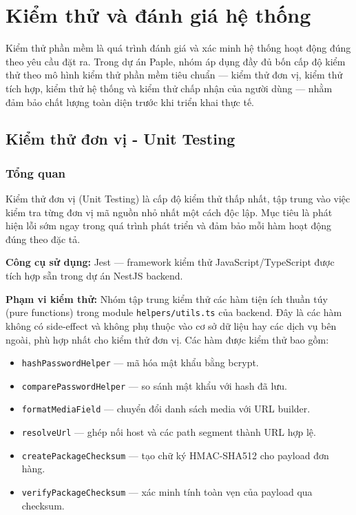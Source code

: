 ﻿\section{Kiểm thử và đánh giá hệ thống}

Kiểm thử phần mềm là quá trình đánh giá và xác minh hệ thống hoạt động đúng theo yêu cầu đặt ra. Trong dự án Paple, nhóm áp dụng đầy đủ bốn cấp độ kiểm thử theo mô hình kiểm thử phần mềm tiêu chuẩn — kiểm thử đơn vị, kiểm thử tích hợp, kiểm thử hệ thống và kiểm thử chấp nhận của người dùng — nhằm đảm bảo chất lượng toàn diện trước khi triển khai thực tế.

\subsection{Kiểm thử đơn vị - Unit Testing}

\subsubsection{Tổng quan}

Kiểm thử đơn vị (Unit Testing) là cấp độ kiểm thử thấp nhất, tập trung vào việc kiểm tra từng đơn vị mã nguồn nhỏ nhất một cách độc lập. Mục tiêu là phát hiện lỗi sớm ngay trong quá trình phát triển và đảm bảo mỗi hàm hoạt động đúng theo đặc tả.

\textbf{Công cụ sử dụng:} Jest — framework kiểm thử JavaScript/TypeScript được tích hợp sẵn trong dự án NestJS backend.

\textbf{Phạm vi kiểm thử:} Nhóm tập trung kiểm thử các hàm tiện ích thuần túy (pure functions) trong module \texttt{helpers/utils.ts} của backend. Đây là các hàm không có side-effect và không phụ thuộc vào cơ sở dữ liệu hay các dịch vụ bên ngoài, phù hợp nhất cho kiểm thử đơn vị. Các hàm được kiểm thử bao gồm:

\begin{itemize}
  \item \texttt{hashPasswordHelper} — mã hóa mật khẩu bằng bcrypt.
  \item \texttt{comparePasswordHelper} — so sánh mật khẩu với hash đã lưu.
  \item \texttt{formatMediaField} — chuyển đổi danh sách media với URL builder.
  \item \texttt{resolveUrl} — ghép nối host và các path segment thành URL hợp lệ.
  \item \texttt{createPackageChecksum} — tạo chữ ký HMAC-SHA512 cho payload đơn hàng.
  \item \texttt{verifyPackageChecksum} — xác minh tính toàn vẹn của payload qua checksum.
\end{itemize}

